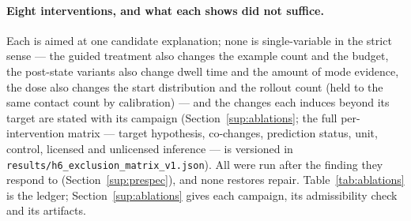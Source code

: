 \documentclass[11pt]{article}
\theoremstyle{definition}
\theoremstyle{remark}
\begin{document}
\paragraph{Eight interventions, and what each shows did not suffice.} Each is aimed at
one candidate explanation; none is single-variable in the strict sense --- the guided
treatment also changes the example count and the budget, the post-state variants also
change dwell time and the amount of mode evidence, the dose also changes the start
distribution and the rollout count (held to the same contact count by calibration) ---
and the changes each induces beyond its target are stated with its campaign
(Section~\ref{sup:ablations}; the full per-intervention matrix --- target
hypothesis, co-changes, prediction status, unit, control, licensed and
unlicensed inference --- is versioned in
\texttt{results/\allowbreak h6\_\allowbreak exclusion\_\allowbreak matrix\_\allowbreak v1.json}).
All were run after the finding they respond to
(Section~\ref{sup:prespec}), and none restores repair. Table~\ref{tab:ablations} is the
ledger; Section~\ref{sup:ablations} gives each campaign, its admissibility check and its
artifacts.
\end{document}
